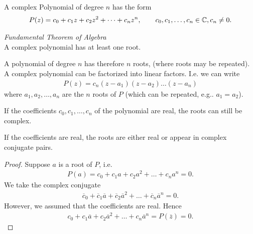 \begin{df}
A complex Polynomial of degree $n$ has the form
\begin{align*}
P(z) = c_0 + c_1 z + c_2 z^2 + \dots + c_n z^n, \qquad c_0, c_1, \dots, c_n \in \mathbb C, c_n \neq 0.
\end{align*}
\end{df}


\begin{tm}
	\emph{Fundamental Theorem of Algebra} \\
	A complex polynomial has at least one root.
\end{tm}

A polynomial of degree $n$ has therefore $n$ roots, (where roots may be repeated). A complex polynomial can be factorized into linear factors.
I.e. we can write
\begin{align*}
P(z) = c_n(z-a_1)(z-a_2)\dots (z-a_n)
\end{align*}
where $a_1, a_2, \dots, a_n$ are the $n$ roots of $P$ (which can be repeated, e.g.. $a_1=a_2$).

If the coefficients $c_0, c_1, \dots, c_n$ of the polynomial are real, the roots can still be complex. 
\begin{pp}
	If the coefficients are real, the roots are either real or appear in complex conjugate pairs.
\end{pp}

\begin{proof}
	Suppose $a$ is a root of $P$, i.e.
	\begin{align*}
	P(a) = c_0 + c_1 a + c_2a^2 + \dots + c_n a^n = 0.
	\end{align*}
	We take the complex conjugate
	\begin{align*}
	\overline c_0 + \overline c_1 \overline a + \overline c_2\overline a^2 + \dots + \overline c_n \overline a^n = 0.
	\end{align*}
	However, we assumed that the coefficients are real. Hence
	\begin{align*}
	 c_0 +  c_1 \overline a +  c_2\overline a^2 + \dots +  c_n \overline a^n = P(\overline z) = 0.
	\end{align*}
\end{proof}

